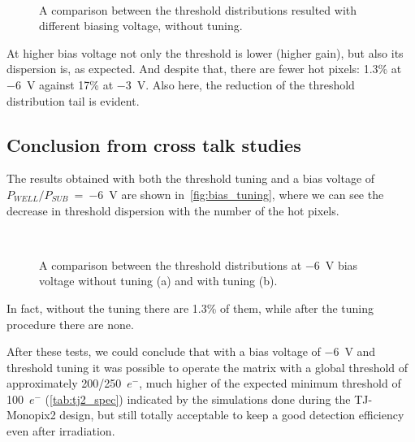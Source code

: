 \begin{figure}[h!]
\centering
{}\quad
{}\\
\caption{A comparison between the threshold distributions resulted with different biasing voltage, without tuning.}
\label{fig:bias_comp}
\end{figure}

At higher bias voltage not only the threshold is lower (higher gain), but also its dispersion is, as expected. And despite that, there are fewer hot pixels: 1.3\% at \SI{-6}{V} against 17\% at \SI{-3}{V}. Also here, the reduction of the threshold distribution tail is evident. 

\subsection{Conclusion from cross talk studies}

The results obtained with both the threshold tuning and a bias voltage of $P_{WELL}/P_{SUB}$~=~\SI{-6}{V} are shown in~\autoref{fig:bias_tuning}, where we can see the decrease in threshold dispersion with the number of the hot pixels.

\begin{figure}[h!]
\centering
{}\quad
{}\\
\caption{A comparison between the threshold distributions at \SI{-6}{V} bias voltage without tuning (a) and with tuning (b).}
\label{fig:bias_tuning}
\end{figure}

In fact, without the tuning there are 1.3\% of them, while after the tuning procedure there are none.

After these tests, we could conclude that with a bias voltage of \SI{-6}{V} and threshold tuning it was possible to operate the matrix with a global threshold of approximately 200/250~$e^{-}$, much higher of the expected minimum threshold of 100~$e^{-}$ (\autoref{tab:tj2_spec}) indicated by the simulations done during the TJ-Monopix2 design, but still totally acceptable to keep a good detection efficiency even after irradiation. 

